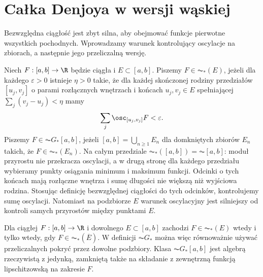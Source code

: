 \section{Całka Denjoya w wersji wąskiej}
\providecommand{\atlasref}[2]{#2}
Bezwzględna ciągłość jest zbyt silna, aby obejmować funkcje pierwotne wszystkich pochodnych. Wprowadzamy warunek kontrolujący oscylacje na zbiorach, a następnie jego przeliczalną wersję.
\begin{definicja}[$\AC_*$ i $\AC G_*$]\label{it:def:acgstar}
Niech $F:[a,b]\to\R$ będzie ciągła i $E\subset[a,b]$. Piszemy $F\in\AC_*(E)$, jeżeli dla każdego $\varepsilon>0$ istnieje $\eta>0$ takie, że dla każdej skończonej rodziny przedziałów $[u_j,v_j]$ o parami rozłącznych wnętrzach i końcach $u_j,v_j\in E$ spełniającej $\sum_j(v_j-u_j)<\eta$ mamy
\[
\sum_j\osc_{[u_j,v_j]}F<\varepsilon.
\]
Piszemy $F\in\AC G_*[a,b]$, jeżeli $[a,b]=\bigcup_{n\ge1}E_n$ dla domkniętych zbiorów $E_n$ takich, że $F\in\AC_*(E_n)$. Na całym przedziale $\AC_*([a,b])=\AC[a,b]$: moduł przyrostu nie przekracza oscylacji, a w drugą stronę dla każdego przedziału wybieramy punkty osiągania minimum i maksimum funkcji. Odcinki o tych końcach mają rozłączne wnętrza i sumę długości nie większą niż wyjściowa rodzina. Stosując definicję bezwzględnej ciągłości do tych odcinków, kontrolujemy sumę oscylacji. Natomiast na podzbiorze $E$ warunek oscylacyjny jest silniejszy od kontroli samych przyrostów między punktami $E$.
\end{definicja}
\begin{twierdzenie}\label{it:thm:acstar-closure-algebra}
Dla ciągłej $F:[a,b]\to\R$ i dowolnego $E\subset[a,b]$ zachodzi
$F\in\AC_*(E)$ wtedy i tylko wtedy, gdy $F\in\AC_*(\overline E)$.
W definicji $\AC G_*$ można więc równoważnie używać przeliczalnych pokryć przez dowolne podzbiory.
Klasa $\AC G_*[a,b]$ jest algebrą rzeczywistą z jedynką, zamkniętą także na składanie z zewnętrzną funkcją lipschitzowską na zakresie $F$.
\end{twierdzenie}
